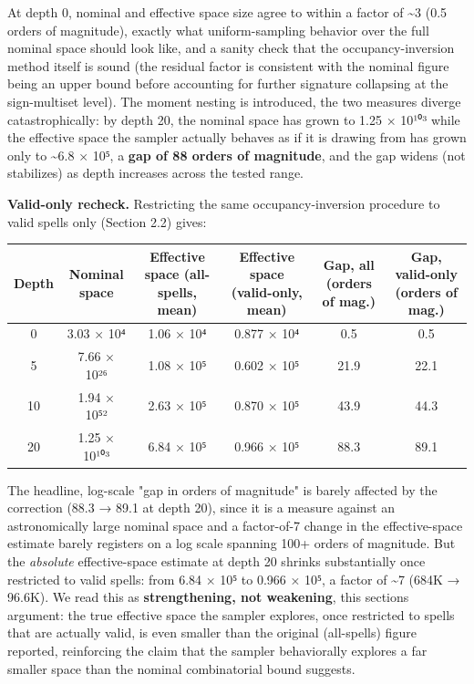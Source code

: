 \documentclass[
  10pt,
  twocolumn]{article}
\begin{document}
At depth 0, nominal and effective space size agree to within a factor of
\textasciitilde3 (0.5 orders of magnitude), exactly what
uniform-sampling behavior over the full nominal space should look like,
and a sanity check that the occupancy-inversion method itself is sound
(the residual factor is consistent with the nominal figure being an
upper bound before accounting for further signature collapsing at the
sign-multiset level). The moment nesting is introduced, the two measures
diverge catastrophically: by depth 20, the nominal space has grown to
1.25 × 10¹⁰³ while the effective space the sampler actually behaves as
if it is drawing from has grown only to \textasciitilde6.8 × 10⁵, a
\textbf{gap of 88 orders of magnitude}, and the gap widens (not
stabilizes) as depth increases across the tested range.

\textbf{Valid-only recheck.} Restricting the same occupancy-inversion
procedure to valid spells only (Section 2.2) gives:

\begin{table}[t]
\centering
\begin{tabular}{@{}cccccc@{}}
\toprule
Depth & Nominal space & Effective space (all-spells, mean) & Effective
space (valid-only, mean) & Gap, all (orders of mag.) & Gap, valid-only
(orders of mag.) \\
\midrule
0 & 3.03 × 10⁴ & 1.06 × 10⁴ & 0.877 × 10⁴ & 0.5 & 0.5 \\
5 & 7.66 × 10²⁶ & 1.08 × 10⁵ & 0.602 × 10⁵ & 21.9 & 22.1 \\
10 & 1.94 × 10⁵² & 2.63 × 10⁵ & 0.870 × 10⁵ & 43.9 & 44.3 \\
20 & 1.25 × 10¹⁰³ & 6.84 × 10⁵ & 0.966 × 10⁵ & 88.3 & 89.1 \\
\bottomrule
\end{tabular}
\end{table}

The headline, log-scale "gap in orders of magnitude" is barely affected
by the correction (88.3 → 89.1 at depth 20), since it is a measure
against an astronomically large nominal space and a factor-of-7 change
in the effective-space estimate barely registers on a log scale spanning
100+ orders of magnitude. But the \emph{absolute} effective-space
estimate at depth 20 shrinks substantially once restricted to valid
spells: from 6.84 × 10⁵ to 0.966 × 10⁵, a factor of \textasciitilde7
(684K → 96.6K). We read this as \textbf{strengthening, not weakening},
this section\textquotesingle s argument: the true effective space the
sampler explores, once restricted to spells that are actually valid, is
even smaller than the original (all-spells) figure reported, reinforcing
the claim that the sampler behaviorally explores a far smaller space
than the nominal combinatorial bound suggests.
\end{document}
